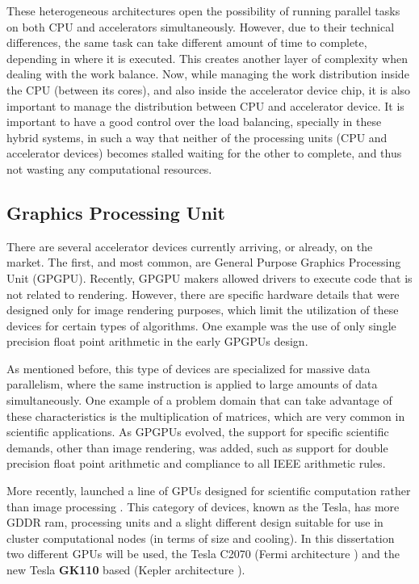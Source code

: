 These heterogeneous architectures open the possibility of running parallel tasks on both CPU and accelerators simultaneously. However, due to their technical differences, the same task can take different amount of time to complete, depending in where it is executed. This creates another layer of complexity when dealing with the work balance. Now, while managing the work distribution inside the CPU (between its cores), and also inside the accelerator device chip, it is also important to manage the distribution between CPU and accelerator device. It is important to have a good control over the load balancing, specially in these hybrid systems, in such a way that neither of the processing units (CPU and accelerator devices) becomes stalled waiting for the other to complete, and thus not wasting any computational resources.

\subsection{Graphics Processing Unit}

There are several accelerator devices currently arriving, or already, on the market. The first, and most common, are General Purpose Graphics Processing Unit (GPGPU). Recently, GPGPU makers allowed drivers to execute code that is not related to rendering. However, there are specific hardware details that were designed only for image rendering purposes, which limit the utilization of these devices for certain types of algorithms. One example was the use of only single precision float point arithmetic in the early GPGPUs design.

As mentioned before, this type of devices are specialized for massive data parallelism, where the same instruction is applied to large amounts of data simultaneously. One example of a problem domain that can take advantage of these characteristics is the multiplication of matrices, which are very common in scientific applications. As GPGPUs evolved, the support for specific scientific demands, other than image rendering, was added, such as support for double precision float point arithmetic and compliance to all IEEE arithmetic rules.

More recently, \nvidia \cite{NVIDIA} launched a line of GPUs designed for scientific computation rather than image processing \cite{NVIDIA:Tesla}. This category of devices, known as the Tesla, has more GDDR ram, processing units and a slight different design suitable for use in cluster computational nodes (in terms of size and cooling). In this dissertation two different \nvidia GPUs will be used, the \nvidia Tesla C2070 (Fermi architecture \cite{NVIDIA:Fermi}) and the new \nvidia Tesla \textbf{GK110} based (Kepler architecture \cite{NVIDIA:Kepler}).

